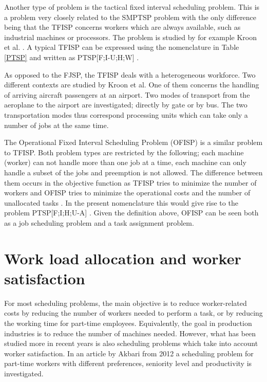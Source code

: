 Another type of problem is the tactical fixed interval scheduling problem. This is a problem very closely related to the SMPTSP problem with the only difference being that the TFISP concerns workers which are always available, such as industrial machines or processors. The problem is studied by for example Kroon et al. \cite{kroon_1997}. A typical TFISP can be expressed using the nomenclature in Table \ref{PTSP} and written as PTSP[F;I-U;H;W] \cite{krishnamoorthy_2001}.

As opposed to the FJSP, the TFISP deals with a heterogeneous workforce. Two different contexts are studied by Kroon et al. One of them concerns the handling of arriving aircraft passengers at an airport. Two modes of transport from the aeroplane to the airport are investigated; directly by gate or by bus. The two transportation modes thus correspond processing units which can take only a number of jobs at the same time.

The Operational Fixed Interval Scheduling Problem (OFISP) is a similar problem to TFISP. Both problem types are restricted by the following; each machine (worker) can not handle more than one job at a time, each machine can only handle a subset of the jobs and preemption is not allowed. The difference between them occurs in the objective function as TFISP tries to minimize the number of workers and OFISP tries to minimize the operational costs and the number of unallocated tasks \cite{kroon_1993}. In the present nomenclature this would give rise to the problem PTSP[F;I;H;U-A] \cite{krishnamoorthy_2001}. Given the definition above, OFISP can be seen both as a job scheduling problem and a task assignment problem.



%

\section{Work load allocation and worker satisfaction} \label{WLA}
For most scheduling problems, the main objective is to reduce worker-related costs by reducing the number of workers needed to perform a task, or by reducing the working time for part-time employees. Equivalently, the goal in production industries is to reduce the number of machines needed. However, what has been studied more in recent years is also scheduling problems which take into account worker satisfaction. In an article by Akbari from 2012 a scheduling problem for part-time workers with different preferences, seniority level and productivity is investigated. \cite{akbari_2012}

